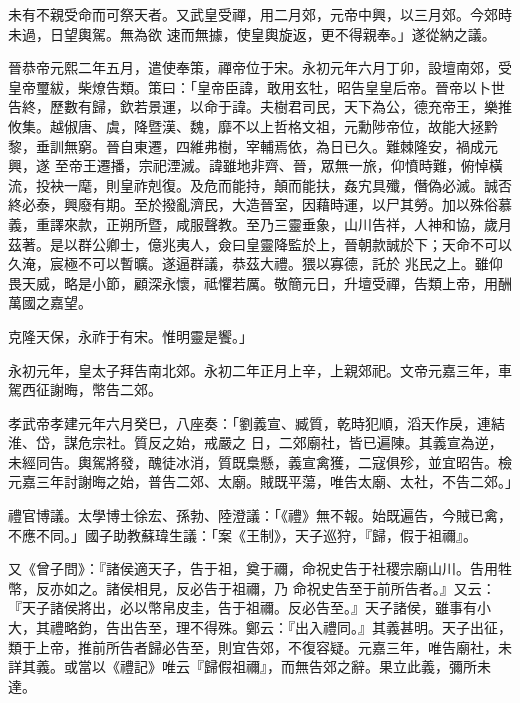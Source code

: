 \begin{pinyinscope}
 未有不親受命而可祭天者。又武皇受禪，用二月郊，元帝中興，以三月郊。今郊時未過，日望輿駕。無為欲
 速而無據，使皇輿旋返，更不得親奉。」遂從納之議。



 晉恭帝元熙二年五月，遣使奉策，禪帝位于宋。永初元年六月丁卯，設壇南郊，受皇帝璽紱，柴燎告類。策曰：「皇帝臣諱，敢用玄牡，昭告皇皇后帝。晉帝以卜世告終，歷數有歸，欽若景運，以命于諱。夫樹君司民，天下為公，德充帝王，樂推攸集。越俶唐、虞，降暨漢、魏，靡不以上哲格文祖，元勳陟帝位，故能大拯黔黎，垂訓無窮。晉自東遷，四維弗樹，宰輔焉依，為日已久。難棘隆安，禍成元興，遂
 至帝王遷播，宗祀湮滅。諱雖地非齊、晉，眾無一旅，仰憤時難，俯悼橫流，投袂一麾，則皇祚剋復。及危而能持，顛而能扶，姦宄具殲，僭偽必滅。誠否終必泰，興廢有期。至於撥亂濟民，大造晉室，因藉時運，以尸其勞。加以殊俗慕義，重譯來款，正朔所暨，咸服聲教。至乃三靈垂象，山川告祥，人神和協，歲月茲著。是以群公卿士，億兆夷人，僉曰皇靈降監於上，晉朝款誠於下；天命不可以久淹，宸極不可以暫曠。遂逼群議，恭茲大禮。猥以寡德，託於
 兆民之上。雖仰畏天威，略是小節，顧深永懷，祗懼若厲。敬簡元日，升壇受禪，告類上帝，用酬萬國之嘉望。



 克隆天保，永祚于有宋。惟明靈是饗。」



 永初元年，皇太子拜告南北郊。永初二年正月上辛，上親郊祀。文帝元嘉三年，車駕西征謝晦，幣告二郊。



 孝武帝孝建元年六月癸巳，八座奏：「劉義宣、臧質，乾時犯順，滔天作戾，連結淮、岱，謀危宗社。質反之始，戒嚴之
 日，二郊廟社，皆已遍陳。其義宣為逆，未經同告。輿駕將發，醜徒冰消，質既梟懸，義宣禽獲，二寇俱殄，並宜昭告。檢元嘉三年討謝晦之始，普告二郊、太廟。賊既平蕩，唯告太廟、太社，不告二郊。」



 禮官博議。太學博士徐宏、孫勃、陸澄議：「《禮》無不報。始既遍告，今賊已禽，不應不同。」國子助教蘇瑋生議：「案《王制》，天子巡狩，『歸，假于祖禰』。



 又《曾子問》：『諸侯適天子，告于祖，奠于禰，命祝史告于社稷宗廟山川。告用牲幣，反亦如之。諸侯相見，反必告于祖禰，乃
 命祝史告至于前所告者。』又云：『天子諸侯將出，必以幣帛皮圭，告于祖禰。反必告至。』天子諸侯，雖事有小大，其禮略鈞，告出告至，理不得殊。鄭云：『出入禮同。』其義甚明。天子出征，類于上帝，推前所告者歸必告至，則宜告郊，不復容疑。元嘉三年，唯告廟社，未詳其義。或當以《禮記》唯云『歸假祖禰』，而無告郊之辭。果立此義，彌所未達。




\end{pinyinscope}
